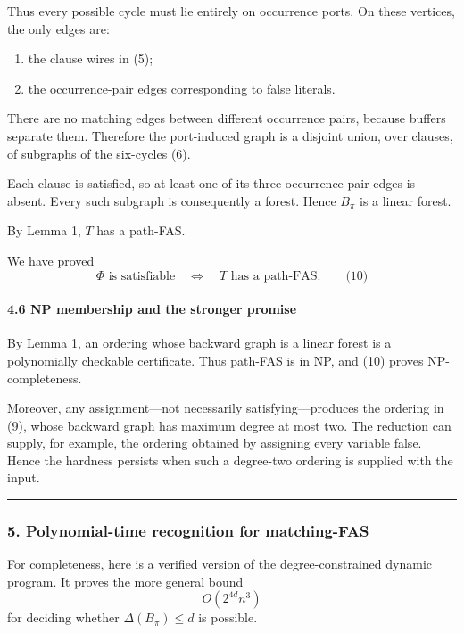 \documentclass[
  11pt,
  a4paper,
]{article}
\providecommand{\tightlist}{%
  \setlength{\itemsep}{0pt}\setlength{\parskip}{0pt}}
\begin{document}
Thus every possible cycle must lie entirely on occurrence ports. On
these vertices, the only edges are:

\begin{enumerate}
\def\labelenumi{\arabic{enumi}.}
\tightlist
\item
  the clause wires in (5);
\item
  the occurrence-pair edges corresponding to false literals.
\end{enumerate}

There are no matching edges between different occurrence pairs, because
buffers separate them. Therefore the port-induced graph is a disjoint
union, over clauses, of subgraphs of the six-cycles (6).

Each clause is satisfied, so at least one of its three occurrence-pair
edges is absent. Every such subgraph is consequently a forest. Hence
\(B_\pi\) is a linear forest.

By Lemma 1, \(T\) has a path-FAS.

We have proved \[
\Phi\text{ is satisfiable}
\quad\Longleftrightarrow\quad
T\text{ has a path-FAS}. \qquad\text{(10)}
\]

\paragraph{4.6 NP membership and the stronger
promise}\label{np-membership-and-the-stronger-promise}

By Lemma 1, an ordering whose backward graph is a linear forest is a
polynomially checkable certificate. Thus path-FAS is in NP, and (10)
proves NP-completeness.

Moreover, any assignment---not necessarily satisfying---produces the
ordering in (9), whose backward graph has maximum degree at most two.
The reduction can supply, for example, the ordering obtained by
assigning every variable false. Hence the hardness persists when such a
degree-two ordering is supplied with the input.

\begin{center}\rule{0.5\linewidth}{0.5pt}\end{center}

\subsubsection{5. Polynomial-time recognition for
matching-FAS}\label{polynomial-time-recognition-for-matching-fas}

For completeness, here is a verified version of the degree-constrained
dynamic program. It proves the more general bound \[
O(2^{4d}n^3)
\] for deciding whether \(\Delta(B_\pi)\le d\) is possible.
\end{document}
